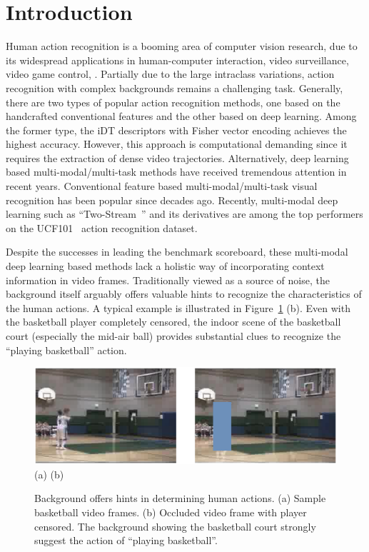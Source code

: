 \documentclass[10pt,twocolumn,letterpaper]{article}
\begin{document}
\section{Introduction}
Human action recognition is a booming area of computer vision research, due to its widespread applications in human-computer interaction, video surveillance, video game control, \etc. Partially due to the large intraclass variations, action recognition with complex backgrounds remains a challenging task. Generally, there are two types of popular action recognition methods, one based on the handcrafted conventional features and the other based on deep learning. Among the former type, the iDT descriptors \cite{wang2013action} with Fisher vector encoding achieves the highest accuracy. However, this approach is computational demanding since it requires the extraction of dense video trajectories. Alternatively, deep learning based multi-modal/multi-task methods have received tremendous attention in recent years. Conventional feature based multi-modal/multi-task visual recognition \cite{zhang2015can,zhang2015auxiliary,zhang2015multi} has been popular since decades ago. Recently, multi-modal deep learning such as ``Two-Stream~\cite{simonyan2014two}'' and its derivatives \cite{Feichtenhofer16, wang2016two,WangQT15a, sun2015human, wang2016temporal} are among the top performers on the UCF101~\cite{soomro2012ucf101} action recognition dataset. 
%


Despite the successes in leading the benchmark scoreboard, these multi-modal deep learning based methods lack a holistic way of incorporating context information in video frames. Traditionally viewed as a source of noise, the background itself arguably offers valuable hints to recognize the characteristics of the human actions. A typical example is illustrated in Figure~\ref{bask_vs} (b). Even with the basketball player completely censored, the indoor scene of the basketball court (especially the mid-air ball) provides substantial clues to recognize the ``playing basketball'' action. 
%
\begin{figure}[t]
\begin{center}
%
\includegraphics[scale=0.6]{imgs/bask_vs.eps}\\
(a) \hspace{2.8in} (b) \\
\caption{Background offers hints in determining human actions. (a) Sample basketball video frames. (b) Occluded video frame with player censored. The background showing the basketball court strongly suggest the action of ``playing basketball''.}
\label{bask_vs}
\end{center}
\end{figure}
%
\end{document}
